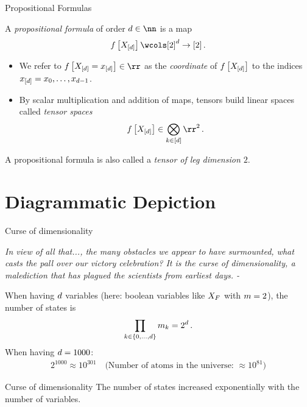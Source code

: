 \documentclass{beamer}
\begin{document}
    \begin{frame}{Propositional Formulas}
        \begin{definition}
            A \emph{propositional formula} of order $\atomorder\in\nn$ is a map
            \begin{align*}
                \formulawith \wcols [2]^{\catorder} \rightarrow [2] \, .
            \end{align*}
            \begin{itemize}
                \item We refer to $\formulaat{\indexedshortcatvariables}\in\rr$ as the \emph{coordinate} of $f\left[X_{[d]}\right]$ to the indices $x_{[d]}=x_{0},\ldots,x_{d-1}$.
                \item By scalar multiplication and addition of maps, tensors build linear spaces called \emph{tensor spaces}
                \[ \formulaat{\shortcatvariables} \in \bigotimes_{\catenumeratorin} \rr^2 \, . \]
            \end{itemize}
        \end{definition}

        A propositional formula is also called a \emph{tensor of leg dimension $2$}.
    \end{frame}

    \section{Diagrammatic Depiction}

    \begin{frame}{Curse of dimensionality}
        \begin{center}
            \it    In view of all that..., the many obstacles we appear to have surmounted, what casts the pall over our victory celebration?
            It is the curse of dimensionality, a malediction that has plagued the scientists from earliest days. - 
        \end{center}

        When having $d$ variables (here: boolean variables like $X_{F}$ with $m=2$), the number of states is
        \begin{align*}
            \prod_{k\in\{0,...,d\}} m_{k} =
            2^{d} \, .
        \end{align*}
        When having $d=1000$:
        \begin{align*}
            2^{1000} \approx 10^{301} \quad \Big(\text{Number of atoms in the universe: }\approx 10^{81}\Big)
        \end{align*}

        \begin{block}{Curse of dimensionality}
            The number of states increased exponentially with the number of variables.
        \end{block}
    \end{frame}
\end{document}
